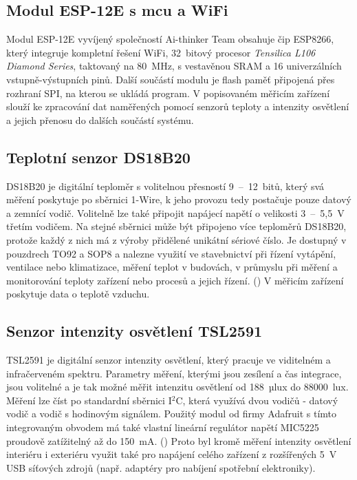     \subsection{Modul ESP-12E s \acrshort{mcu} a WiFi}
        Modul ESP-12E vyvíjený společností Ai-thinker Team obsahuje čip ESP8266, který integruje kompletní řešení WiFi, 32~bitový procesor \emph{Tensilica L106 Diamond Series}, taktovaný na 80~MHz, s vestavěnou SRAM a 16 univerzálních vstupně-výstupních pinů. Další součástí modulu je flash paměť připojená přes rozhraní SPI, na kterou se ukládá program. \cite{ai-thinker:esp12e} V popisovaném měřicím zařízení slouží ke zpracování dat naměřených pomocí senzorů teploty a intenzity osvětlení a jejich přenosu do dalších součástí systému.
    \subsection{Teplotní senzor DS18B20}
        DS18B20 je digitální teploměr s volitelnou přesností 9~--~12~bitů, který svá měření poskytuje po sběrnici 1-Wire, k jeho provozu tedy postačuje pouze datový a zemnící vodič. Volitelně lze také připojit napájecí napětí o velikosti 3~--~5{,}5~V třetím vodičem. Na stejné sběrnici může být připojeno více teploměrů DS18B20, protože každý z nich má z výroby přidělené unikátní sériové číslo. Je dostupný v pouzdrech TO92 a SOP8 a nalezne využití ve stavebnictví při řízení vytápění, ventilace nebo klimatizace, měření teplot v budovách, v průmyslu při měření a monitorování teploty zařízení nebo procesů a jejich řízení. (\cite{dallas:ds18b20}) V měřicím zařízení poskytuje data o teplotě vzduchu.
    \subsection{Senzor intenzity osvětlení TSL2591}
        TSL2591 je digitální senzor intenzity osvětlení, který pracuje ve viditelném a infračerveném spektru. Parametry měření, kterými jsou zesílení a čas integrace, jsou volitelné a je tak možné měřit intenzitu osvětlení od 188~µlux do $88000$~lux. Měření lze číst po standardní sběrnici I$^2$C, která využívá dvou vodičů - datový vodič a vodič s hodinovým signálem. Použitý modul od firmy Adafruit s tímto integrovaným obvodem má také vlastní lineární regulátor napětí MIC5225 proudově zatížitelný až do 150~mA. (\cite{adafruit:tsl2591}) Proto byl kromě měření intenzity osvětlení interiéru i exteriéru využit také pro napájení celého zařízení z rozšířených 5~V USB síťových zdrojů (např. adaptéry pro nabíjení spotřební elektroniky).
